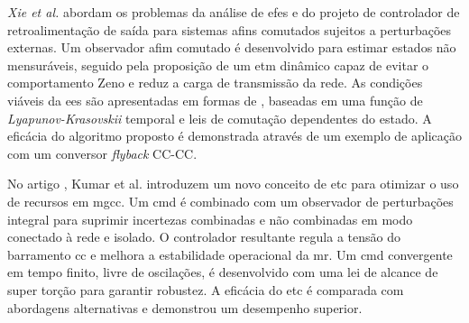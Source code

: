 \textit{Xie et al.} \cite{Xie2023} abordam os problemas da análise de \acrshort{efes} e do projeto de controlador de retroalimentação de saída para sistemas afins comutados sujeitos a perturbações externas. Um observador afim comutado é desenvolvido para estimar estados não mensuráveis, seguido pela proposição de um \acrshort{etm} dinâmico capaz de evitar o comportamento Zeno e reduz a carga de transmissão da rede. As condições viáveis da \acrshort{ees} são apresentadas em formas de , baseadas em uma função de \textit{Lyapunov-Krasovskii} temporal e leis de comutação dependentes do estado. A eficácia do algoritmo proposto é demonstrada através de um exemplo de aplicação com um conversor \textit{flyback} CC-CC.

No artigo \cite{Kumar2020}, Kumar et al. introduzem um novo conceito de \acrshort{etc} para otimizar o uso de recursos em \acrshort{mgcc}. Um \acrfull{cmd} é combinado com um observador de perturbações integral para suprimir incertezas combinadas e não combinadas em modo conectado à rede e isolado. O controlador resultante regula a tensão do barramento \acrshort{cc} e melhora a estabilidade operacional da \acrshort{mr}. Um \acrshort{cmd} convergente em tempo finito, livre de oscilações, é desenvolvido com uma lei de alcance de super torção para garantir robustez. A eficácia do \acrshort{etc} é comparada com abordagens alternativas e demonstrou um desempenho superior.
